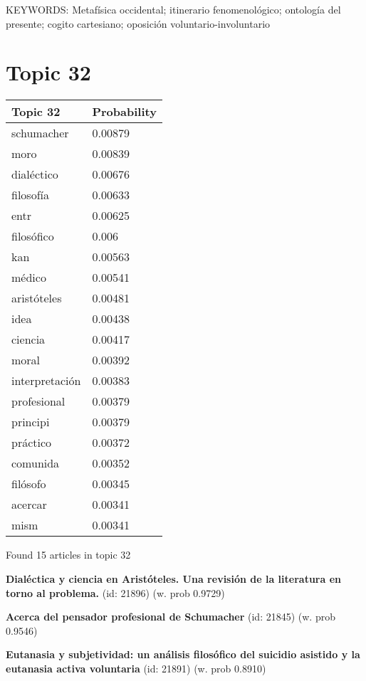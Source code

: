 \documentclass{article}
\begin{document}
KEYWORDS:
Metafísica occidental; itinerario fenomenológico; ontología del presente; cogito cartesiano; oposición voluntario-involuntario

\vfill
\newpage


\centering
\thispagestyle{empty}
\section*{Topic 32}\vfill
\begin{tabular}{ll}
\toprule
       Topic 32 & Probability \\
\midrule
     schumacher &     0.00879 \\
           moro &     0.00839 \\
     dialéctico &     0.00676 \\
      filosofía &     0.00633 \\
           entr &     0.00625 \\
     filosófico &       0.006 \\
            kan &     0.00563 \\
         médico &     0.00541 \\
    aristóteles &     0.00481 \\
           idea &     0.00438 \\
        ciencia &     0.00417 \\
          moral &     0.00392 \\
 interpretación &     0.00383 \\
    profesional &     0.00379 \\
       principi &     0.00379 \\
       práctico &     0.00372 \\
       comunida &     0.00352 \\
       filósofo &     0.00345 \\
        acercar &     0.00341 \\
           mism &     0.00341 \\
\bottomrule
\end{tabular}

\vfill
Found 15 articles in topic 32
\vfill

\textbf{Dialéctica y ciencia en Aristóteles. Una revisión de la literatura en torno al problema.} (id: 21896)
 (w. prob 0.9729)
\vfill

\textbf{Acerca del pensador profesional de Schumacher} (id: 21845)
 (w. prob 0.9546)
\vfill

\textbf{Eutanasia y subjetividad: un análisis filosófico del suicidio asistido y la eutanasia activa voluntaria} (id: 21891)
 (w. prob 0.8910)
\end{document}
